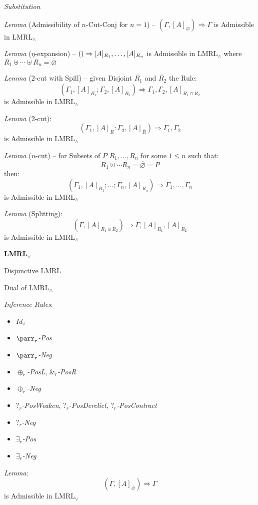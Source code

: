 \emph{Substitution} %

\emph{Lemma} (Admissibility of $n$-Cut-Conj for $n = 1$) -- $(\Gamma,
     [A]_\varnothing) \Rightarrow \Gamma$ is Admissible in
     LMRL$_\wedge$

\emph{Lemma} ($\eta$-expansion) -- $\mathsf{()} \Rightarrow [A]_{R_1}, \ldots,
     [A]_{R_n}$ is Admissible in LMRL$_\wedge$ where $R_1 \uplus
     \cdots \uplus R_n = \overline{\varnothing}$

\emph{Lemma} (2-cut with Spill) -- given Disjoint $\overline{R_1}$ and
$\overline{R_2}$ the Rule:
\[
  (\Gamma_1, [A]_{R_1}; \Gamma_2,[A]_{R_2}) \Rightarrow
    \Gamma_1, \Gamma_2, [A]_{R_1 \cap R_2}
\]
is Admissible in LMRL$_\wedge$

\emph{Lemma} (2-cut):
\[
  (\Gamma_1, [A]_R : \Gamma_2, [A]_{\overline{R}})
    \Rightarrow \Gamma_1,\Gamma_2
\]
is Admissible in LMRL$_\wedge$

\emph{Lemma} ($n$-cut) -- for Subsets of $P$ $R_1,\ldots,R_n$ for some
$1 \leq n$ such that:
\[
  \overline{R_1} \uplus \cdots \overline{R_n} = \overline{\varnothing}
    = P
\]
then:
\[
  (\Gamma_1,[A]_{R_1}; \ldots; \Gamma_n,[A]_{R_n})
    \Rightarrow \Gamma_1, \ldots, \Gamma_n
\]
is Admissible in LMRL$_\wedge$

\emph{Lemma} (Splitting):
\[
  (\Gamma,[A]_{R_1 \uplus R_2}) \Rightarrow \Gamma,[A]_{R_1},[A]_{R_2}
\]
is Admissible in LMRL$_\wedge$


\textbf{LMRL$_\vee$}

Disjunctive LMRL

Dual of LMRL$_\wedge$

\emph{Inference Rules}:
\begin{itemize}
  \item \emph{Id$_\vee$}
  \item \emph{$\parr_r$-Pos}
  \item \emph{$\parr_r$-Neg}
  \item \emph{$\oplus_r$-PosL}, \emph{$\&_r$-PosR}
  \item \emph{$\oplus_r$-Neg}
  \item \emph{$?_r$-PosWeaken}, \emph{$?_r$-PosDerelict},
    \emph{$?_r$-PosContract}
  \item \emph{$?_r$-Neg}
  \item \emph{$\exists_r$-Pos}
  \item \emph{$\exists_r$-Neg}
\end{itemize}

\emph{Lemma}:
\[
  (\Gamma, [A]_{\overline{\varnothing}}) \Rightarrow \Gamma
\]
is Admissible in LMRL$_\vee$

